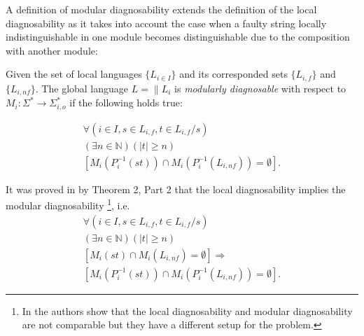\documentclass[a4paper, 10pt, conference]{ieeeconf} \IEEEoverridecommandlockouts
\begin{document}
A definition of modular diagnosability extends the definition of the local
diagnosability as it takes into account the case when a faulty string locally
indistinguishable in one module becomes distinguishable due to the
composition with another module:

\begin{definition} Given the set of local languages
$\{L_{i \in I}\}$ and its corresponded sets $\{L_{i,f}\}$ and
$\{L_{i,nf}\}$. The global language $L = \parallel L_i$ is \emph{modularly
diagnosable} with respect to
$M_i: \Sigma^* \rightarrow \Sigma_{i,o}^*$ 
if the following holds true:
\end{definition}
\begin{equation}
\begin{array}{l}
	\forall(i \in I, s \in L_{i,f}, t \in L_{i,f}/s)
	\\
	(\exists n \in \mathbb{N})
	(|t| \geq n)
	\\
	\left[ M_i(P_i^{-1}(st)) \cap M_i(P_i^{-1}(L_{i,nf})) = \emptyset \right].
\end{array}
\end{equation}

It was proved in \cite{contant_diagnosability_2006} by Theorem 2, Part 2 
that the local diagnosability implies the modular diagnosability \footnote{In
\cite{zhou_decentralized_2008} the authors show that the local diagnosability
and modular diagnosability are not comparable but they have a different setup
for the problem.}, i.e.
$$
\begin{array}{l}
	\forall(i \in I, s \in L_{i,f}, t \in L_{i,f}/s)
	\\
	(\exists n \in \mathbb{N})
	(|t| \geq n)
	\\
	\left[ M_i(st) \cap M_i(L_{i,nf}) = \emptyset \right]
	\Rightarrow \\ 
	\left[ M_i(P_i^{-1}(st)) \cap M_i(P_i^{-1}(L_{i,nf})) = \emptyset \right].
\end{array}
$$

   
% 
\end{document}
